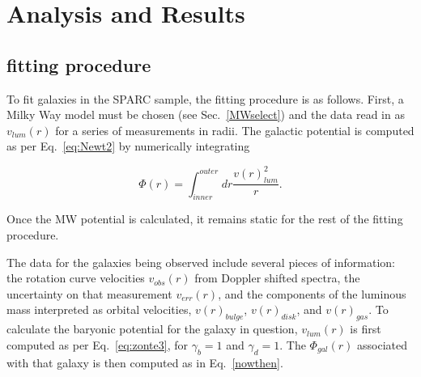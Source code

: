 \documentclass[reprint,%
 amsmath,amssymb,
 aps,
]{revtex4-1}
\begin{document}
 

 


 








\section{  Analysis and Results \label{sec:analysis}}
 
 

 
 
 




\subsection{fitting procedure}



To fit galaxies in the SPARC sample,  the fitting procedure is as follows.   First,  a       Milky Way model must be chosen (see Sec.~\ref{MWselect})  and the data  read in as $v_{lum}(r)$ for a series of measurements in radii. The galactic potential is computed as per Eq.~\ref{eq:Newt2} by numerically integrating

\begin{equation}
\Phi(r) = \int_{inner}^{outer} dr \frac{ 
v(r)^2_{lum} 
}{r}.
\label{nowthen}
\end{equation}

Once the MW potential is calculated, it remains static for the rest of the fitting procedure.  

The data for the   galaxies being observed include several pieces of information: the rotation curve velocities $v_{obs}(r)$ from Doppler shifted spectra, the uncertainty on that measurement $v_{err}(r)$, and the components of the luminous mass interpreted as orbital velocities,  $v(r)_{bulge}$, $v(r)_{disk}$, and $v(r)_{gas}$. 
To calculate the baryonic potential for the galaxy in question, $v_{lum}(r)$ is first computed   as per Eq.~\ref{eq:zonte3}, for $\gamma_b=1$ and $\gamma_d=1$. The $\Phi_{gal}(r)$ associated with that galaxy   is then computed as in Eq.~\ref{nowthen}.
\end{document}

